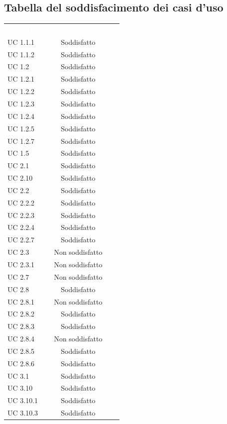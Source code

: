 \subsection{Tabella del soddisfacimento dei casi d’uso}
	\renewcommand{\arraystretch}{1.5}
	\begin{longtable}{C{4cm} c c c}
		\textcolor{white}{\textbf{Caso D'uso}} & \textcolor{white}{\textbf{Stato}}\\
UC 1.1.1 & Soddisfatto \\
UC 1.1.2 & Soddisfatto \\
UC 1.2 & Soddisfatto \\
UC 1.2.1 & Soddisfatto \\
UC 1.2.2 & Soddisfatto \\
UC 1.2.3 & Soddisfatto \\
UC 1.2.4 & Soddisfatto \\
UC 1.2.5 & Soddisfatto \\
UC 1.2.7 & Soddisfatto \\
UC 1.5 & Soddisfatto \\
UC 2.1 & Soddisfatto \\
UC 2.10 & Soddisfatto \\
UC 2.2 & Soddisfatto \\
UC 2.2.2 & Soddisfatto \\
UC 2.2.3 & Soddisfatto \\
UC 2.2.4 & Soddisfatto \\
UC 2.2.7 & Soddisfatto \\
UC 2.3 & Non soddisfatto \\
UC 2.3.1 & Non soddisfatto \\
UC 2.7 & Non soddisfatto \\
UC 2.8 & Soddisfatto \\
UC 2.8.1 & Non soddisfatto \\
UC 2.8.2 & Soddisfatto \\
UC 2.8.3 & Soddisfatto \\
UC 2.8.4 & Non soddisfatto \\
UC 2.8.5 & Soddisfatto \\
UC 2.8.6 & Soddisfatto \\
UC 3.1 & Soddisfatto \\
UC 3.10 & Soddisfatto \\
UC 3.10.1 & Soddisfatto \\
UC 3.10.3 & Soddisfatto \\

\end{longtable}
